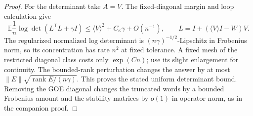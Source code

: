 \begin{proof}
For the determinant take $A=V$.  The fixed-diagonal margin and loop
calculation give
\[
 \mathbb E\frac1n\log\det(L^{\mathsf T}L+\gamma I)
 \le\langle V\rangle^2+C_\kappa\gamma+O(n^{-1}),
 \qquad L=I+(\langle V\rangle I-W)V.
\]
The regularized normalized log determinant is $(n\gamma)^{-1/2}$-Lipschitz in
Frobenius norm, so its concentration has rate $n^2$ at fixed tolerance. A
fixed mesh of the restricted diagonal class costs only $\exp(Cn)$; use its
slight enlargement for continuity. The bounded-rank perturbation changes the
answer by at most $\|E\|\sqrt{\operatorname{rank}E/(n\gamma)}$. This proves
the stated uniform determinant bound. Removing the GOE diagonal changes the
truncated words by a bounded Frobenius amount and the stability matrices by
$o(1)$ in operator norm, as in the companion proof. \end{proof}

